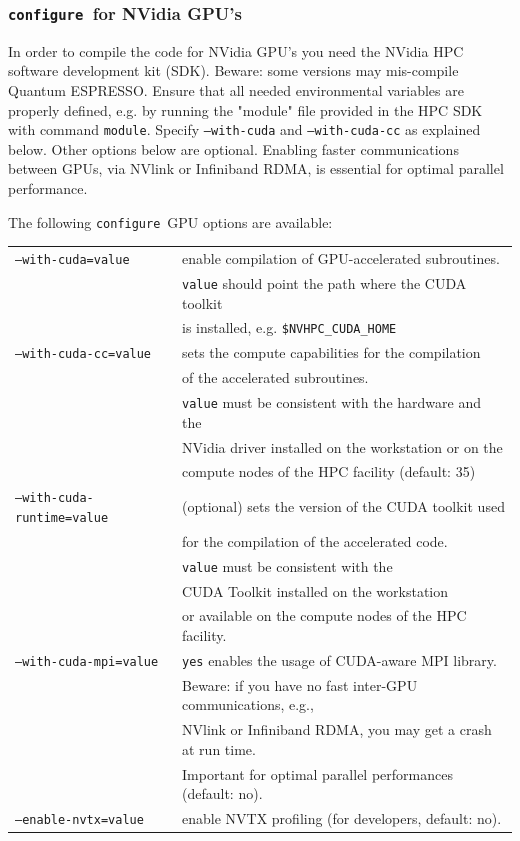 \documentclass[12pt,a4paper]{article}
\def\qe{{\sc Quantum ESPRESSO}}
\def\configure{\texttt{configure}}
\begin{document}
\subsubsection{\configure\ for NVidia GPU's}
In order to compile the code for NVidia GPU's you need the NVidia HPC software
development kit (SDK). Beware: some versions may mis-compile \qe.
Ensure that all needed environmental variables
are properly defined, e.g. by running the "module" file provided in the HPC SDK with command
\texttt{module}. Specify \texttt{--with-cuda} and \texttt{--with-cuda-cc} as explained 
below. Other options below
are optional. Enabling faster communications between GPUs, via NVlink or Infiniband RDMA, 
is essential for optimal parallel performance. 

The following \configure\ GPU options are available:\\
\begin{tabular}{ll}
\texttt{--with-cuda=value}&         enable compilation of GPU-accelerated subroutines.\\
                          &         \texttt{value} should point the path where the CUDA toolkit \\
                          &         is installed, e.g. \texttt{\$NVHPC\_CUDA\_HOME}\\
\texttt{--with-cuda-cc=value}&      sets the compute capabilities for the compilation\\
                             &      of the accelerated subroutines. \\
                             &      \texttt{value} must be consistent with the hardware and the\\
                             &      NVidia driver installed on the workstation or on the\\
                             &      compute nodes of the HPC facility (default: 35)\\
\texttt{--with-cuda-runtime=value}& (optional) sets the version of the CUDA toolkit used \\
                                  & for the compilation of the accelerated code.\\
                                  & \texttt{value} must be consistent with the\\
                                  & CUDA Toolkit installed on the workstation \\
                                  & or available on the compute nodes of the HPC facility.\\
\texttt{--with-cuda-mpi=value}    & \texttt{yes} enables the usage of CUDA-aware MPI library.\\
                                  & Beware: if you have no fast inter-GPU communications, e.g.,\\
				  & NVlink or Infiniband RDMA, you may get a crash at run time.\\
				  & Important for optimal parallel performances (default: no).\\
\texttt{--enable-nvtx=value}      & enable NVTX profiling (for developers, default: no).\\
\end{tabular}
\end{document}
